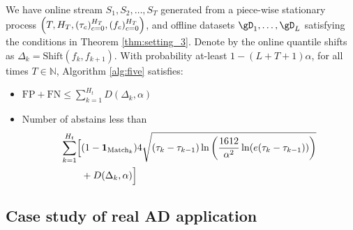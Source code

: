





\begin{theorem} We have online stream $S_1, S_2, \ldots, S_T$  generated from a piece-wise stationary process $\Bigl(T,H_T, (\tau_c)_{c=0}^{H_T}, (f_c)_{c=0}^{H_T}\Bigr)$, and offline datasets  $\gD_1, \ldots, \gD_L$ satisfying the conditions in Theorem \ref{thm:setting_3}. Denote by the online quantile shifts as $\Delta_{k} = \text{Shift} (f_{k},f_{k+1})$. With probability at-least $1-(L+T+1)\alpha$, for all times $T \in \mathbb{N}$, Algorithm \ref{alg:five} satisfies:
\begin{itemize}[noitemsep, topsep=-5pt,labelwidth=!, labelindent=0pt]
    \item  $\text{FP} + \text{FN}  \leq \sum_{k=1}^{H_t}D(\Delta_{k},\alpha)$ 
    \item Number of abstains less than 
    \begin{align*}
        \sum_{k=1}^{H_t} \Bigl[ &(1-\mathbf{1}_{\text{Match}_k}) 4 \sqrt{(\tau_k-\tau_{k-1}) \ln \left( \frac{1612}{\alpha^2} \ln(e(\tau_k-\tau_{k-1})) \right)} \\ & +  D(\Delta_{k},\alpha) \Bigr]
    \end{align*}
\end{itemize}
\label{thm:core_theorem}
\end{theorem}


\subsection{Case study of real AD application}

